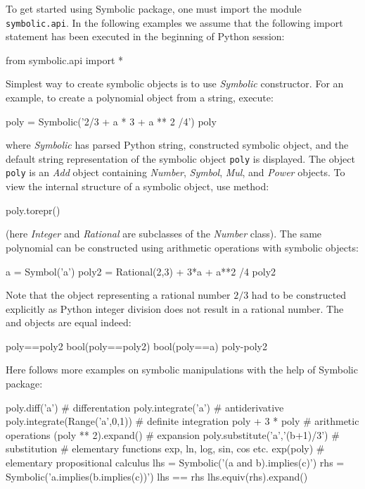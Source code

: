 \documentclass[a4paper,12pt]{article}
\newcommand{\Symbolic}[0]{\emph{Symbolic}\xspace}
\newcommand{\Add}[0]{\emph{Add}\xspace}
\newcommand{\Mul}[0]{\emph{Mul}\xspace}
\newcommand{\Power}[0]{\emph{Power}\xspace}
\newcommand{\Symbol}[0]{\emph{Symbol}\xspace}
\newcommand{\Number}[0]{\emph{Number}\xspace}
\newcommand{\Integer}[0]{\emph{Integer}\xspace}
\newcommand{\Rational}[0]{\emph{Rational}\xspace}
\begin{document}
To get started using Symbolic package, one must import the module
\texttt{symbolic.api}. In the following examples we assume that the following
import statement has been executed in the beginning of Python session:
\begin{python}
from symbolic.api import *
\end{python}
Simplest way to create symbolic objects is to use \Symbolic constructor.
For an example, to create a polynomial object from a string, execute:
\begin{python}
poly = Symbolic('2/3 + a * 3 + a ** 2 /4')
poly
\end{python}
where \Symbolic has parsed Python string, constructed symbolic object,
and the default string representation of the symbolic object
\texttt{poly} is displayed.  The object \texttt{poly} is an \Add
object containing \Number, \Symbol, \Mul, and \Power objects. To view
the internal structure of a symbolic object, use 
method:
\begin{python}
poly.torepr()
\end{python}
(here \Integer and \Rational are subclasses of the \Number class).
The same polynomial can be constructed using arithmetic operations with symbolic objects:
\begin{python}
a = Symbol('a')
poly2 = Rational(2,3) + 3*a + a**2 /4
poly2
\end{python}
Note that the object representing a rational number $2/3$ had to be
constructed explicitly as Python integer division does not result in a
rational number.  The  and  objects are
equal indeed:
\begin{python}
poly==poly2
bool(poly==poly2)
bool(poly==a)
poly-poly2
\end{python}
Here follows more examples on symbolic manipulations with the help of
Symbolic package:
\begin{python}
poly.diff('a')                     # differentation
poly.integrate('a')                # antiderivative
poly.integrate(Range('a',0,1))     # definite integration
poly + 3 * poly                    # arithmetic operations
(poly ** 2).expand()               # expansion
poly.substitute('a','(b+1)/3')     # substitution
# elementary functions exp, ln, log, sin, cos etc.
exp(poly)
# elementary propositional calculus
lhs = Symbolic('(a and b).implies(c)')
rhs = Symbolic('a.implies(b.implies(c))')
lhs == rhs
lhs.equiv(rhs).expand()
\end{python}
\end{document}
